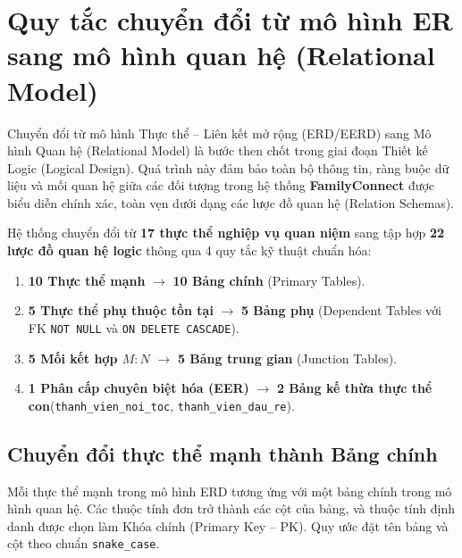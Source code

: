 \section{Quy tắc chuyển đổi từ mô hình ER sang mô hình quan hệ (Relational Model)}
\label{sec:2_1_quy_tac_chuyen_doi}

Chuyển đổi từ mô hình Thực thể -- Liên kết mở rộng (ERD/EERD) sang Mô hình Quan hệ (Relational Model) là bước then chốt trong giai đoạn Thiết kế Logic (Logical Design). Quá trình này đảm bảo toàn bộ thông tin, ràng buộc dữ liệu và mối quan hệ giữa các đối tượng trong hệ thống \textbf{FamilyConnect} được biểu diễn chính xác, toàn vẹn dưới dạng các lược đồ quan hệ (Relation Schemas).

Hệ thống chuyển đổi từ \textbf{17 thực thể nghiệp vụ quan niệm} sang tập hợp \textbf{22 lược đồ quan hệ logic} thông qua 4 quy tắc kỹ thuật chuẩn hóa:
\begin{enumerate}
    \item \textbf{10 Thực thể mạnh} $\longrightarrow$ \textbf{10 Bảng chính} (Primary Tables).
    \item \textbf{5 Thực thể phụ thuộc tồn tại} $\longrightarrow$ \textbf{5 Bảng phụ} (Dependent Tables với FK \texttt{NOT NULL} và \texttt{ON DELETE CASCADE}).
    \item \textbf{5 Mối kết hợp $M{:}N$} $\longrightarrow$ \textbf{5 Bảng trung gian} (Junction Tables).
    \item \textbf{1 Phân cấp chuyên biệt hóa (EER)} $\longrightarrow$ \textbf{2 Bảng kế thừa thực thể con}\newline (\texttt{thanh\_vien\_noi\_toc}, \texttt{thanh\_vien\_dau\_re}).
\end{enumerate}

\newlength{\tblcellwd}
\newcommand{\tblcellfit}[1]{%
    \settowidth{\tblcellwd}{\small#1}%
    \ifdim\tblcellwd>\linewidth
        \resizebox{\linewidth}{!}{#1}%
    \else
        \small#1%
    \fi
}

\subsection{Chuyển đổi thực thể mạnh thành Bảng chính}
\label{subsec:2_1_1_chuyen_doi_thuc_the}

Mỗi thực thể mạnh trong mô hình ERD tương ứng với một bảng chính trong mô hình quan hệ. Các thuộc tính đơn trở thành các cột của bảng, và thuộc tính định danh được chọn làm Khóa chính (Primary Key -- PK). Quy ước đặt tên bảng và cột theo chuẩn \texttt{snake\_case}.


